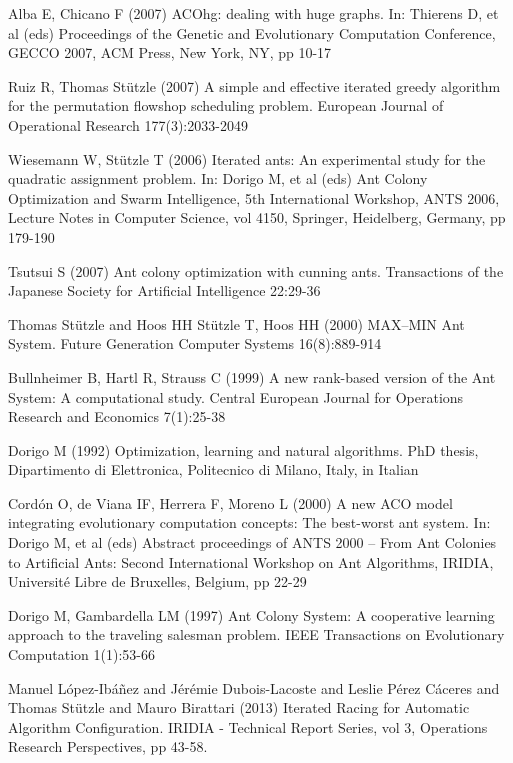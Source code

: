 \documentclass[12pt]{article}
\begin{document}
\begin{thebibliography}{1}
 Alba E, Chicano F (2007) ACOhg: dealing with huge graphs. In: Thierens D, et al (eds) Proceedings of the Genetic and Evolutionary Computation Conference, GECCO 2007, ACM Press, New York, NY, pp 10-17

 Ruiz R, Thomas St{\"u}tzle (2007) A simple and effective iterated greedy algorithm for the permutation flowshop scheduling problem. European Journal of Operational Research 177(3):2033-2049

 Wiesemann W, St{\"u}tzle T (2006) Iterated ants: An experimental study for the quadratic assignment problem. In: Dorigo M, et al (eds) Ant Colony Optimization and Swarm Intelligence, 5th International Workshop, ANTS 2006, Lecture Notes in Computer Science, vol 4150, Springer, Heidelberg, Germany, pp 179-190

 Tsutsui S (2007) Ant colony optimization with cunning ants. Transactions of the Japanese Society for Artificial Intelligence 22:29-36

 Thomas St{\"u}tzle and Hoos HH Stützle T, Hoos HH (2000) MAX–MIN Ant System. Future Generation Computer Systems 16(8):889-914

 Bullnheimer B, Hartl R, Strauss C (1999) A new rank-based version of the Ant System: A computational study. Central European Journal for Operations Research and Economics 7(1):25-38

 Dorigo M (1992) Optimization, learning and natural algorithms. PhD thesis, Dipartimento di Elettronica, Politecnico di Milano, Italy, in Italian

 Cord{\'o}n O, de Viana IF, Herrera F, Moreno L (2000) A new ACO model integrating evolutionary computation concepts: The best-worst ant system. In: Dorigo M, et al (eds) Abstract proceedings of ANTS 2000 – From Ant Colonies to Artificial Ants: Second International Workshop on Ant Algorithms, IRIDIA, Universit{\'e} Libre de Bruxelles, Belgium, pp 22-29

 Dorigo M, Gambardella LM (1997) Ant Colony System: A cooperative learning approach to the traveling salesman problem. IEEE Transactions on Evolutionary Computation 1(1):53-66

 Manuel L{\'o}pez-Ib{\'a}{\~n}ez and J{\'e}r{\'e}mie Dubois-Lacoste and Leslie {P{\'e}rez C{\'a}ceres} and Thomas St{\"u}tzle  and  Mauro Birattari (2013) Iterated Racing for Automatic Algorithm Configuration. IRIDIA - Technical Report Series, vol 3, Operations Research Perspectives, pp 43-58.


\end{thebibliography}
\end{document}
